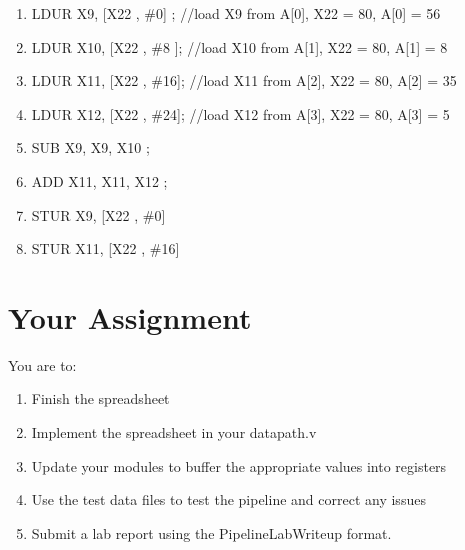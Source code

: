 \begin{enumerate}
\item LDUR X9, [X22 , \#0] ;     //load X9 from A[0], X22 = 80, A[0] = 56
\item LDUR X10, [X22 , \#8 ];    //load X10 from A[1], X22 = 80, A[1] = 8
\item LDUR X11, [X22 , \#16];    //load X11 from A[2], X22 = 80, A[2] = 35 
\item LDUR X12, [X22 , \#24];    //load X12 from A[3], X22 = 80, A[3] = 5
\item SUB X9, X9, X10 ; 
\item ADD X11, X11, X12 ; 
\item STUR X9,  [X22 , \#0]
\item STUR X11, [X22 , \#16]
\end{enumerate}
  


\section{Your Assignment}

You are to:
\begin{enumerate}
\item Finish the spreadsheet
\item Implement the spreadsheet in your datapath.v
\item Update your modules to buffer the appropriate values into registers
\item Use the test data files to test the pipeline and correct any issues
\item Submit a lab report using the PipelineLabWriteup format.
\end{enumerate} 